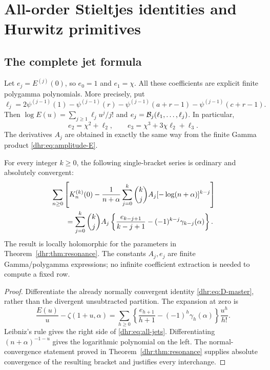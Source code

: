 \section{All-order Stieltjes identities and Hurwitz primitives}
\label{dhr:sec:stieltjes}

\subsection{The complete jet formula}
Let $e_j=E^{(j)}(0)$, so $e_0=1$ and $e_1=\chi$. All these
coefficients are explicit finite polygamma polynomials. More precisely,
put
\begin{equation}\label{dhr:eq:ell}
 \ell_j=2\psi^{(j-1)}(1)-\psi^{(j-1)}(r)
        -\psi^{(j-1)}(a+r-1)-\psi^{(j-1)}(c+r-1).
\end{equation}
Then $\log E(u)=\sum_{j\geq1}\ell_j u^j/j!$ and
$e_j=\mathcal B_j(\ell_1,\ldots,\ell_j)$. In particular,
\[
 e_2=\chi^2+\ell_2,\qquad
 e_3=\chi^3+3\chi\ell_2+\ell_3.
\]
The derivatives $A_j$ are obtained in exactly the same way from the
finite Gamma product \eqref{dhr:eq:amplitude-E}.

\begin{theorem}\label{dhr:thm:jets}
For every integer $k\geq0$, the following single-bracket series is
ordinary and absolutely convergent:
\begin{align}
 &\sum_{n\geq0}\left[
 K_n^{(k)}(0)-\frac1{n+\alpha}
 \sum_{j=0}^k\binom{k}{j}A_j[-\log(n+\alpha)]^{k-j}
 \right]\notag\\
 &\qquad=\sum_{j=0}^k\binom{k}{j}A_j
 \left\{\frac{e_{k-j+1}}{k-j+1}
       -(-1)^{k-j}\gamma_{k-j}(\alpha)\right\}.
 \label{dhr:eq:all-jets}
\end{align}
The result is locally holomorphic for the parameters in
Theorem~\ref{dhr:thm:resonance}. The constants $A_j,e_j$ are finite
Gamma/polygamma expressions; no infinite coefficient extraction is
needed to compute a fixed row.
\end{theorem}
\begin{proof}
Differentiate the already normally convergent identity
\eqref{dhr:eq:D-master}, rather than the divergent unsubtracted
partition. The expansion at zero is
\[
 \frac{E(u)}u-\zeta(1+u,\alpha)
 =\sum_{h\geq0}\left\{\frac{e_{h+1}}{h+1}
               -(-1)^h\gamma_h(\alpha)\right\}\frac{u^h}{h!}.
\]
Leibniz's rule gives the right side of \eqref{dhr:eq:all-jets}.
Differentiating $(n+\alpha)^{-1-u}$ gives the logarithmic polynomial
on the left. The normal-convergence statement proved in
Theorem~\ref{dhr:thm:resonance} supplies absolute convergence of the
resulting bracket and justifies every interchange.
\end{proof}

